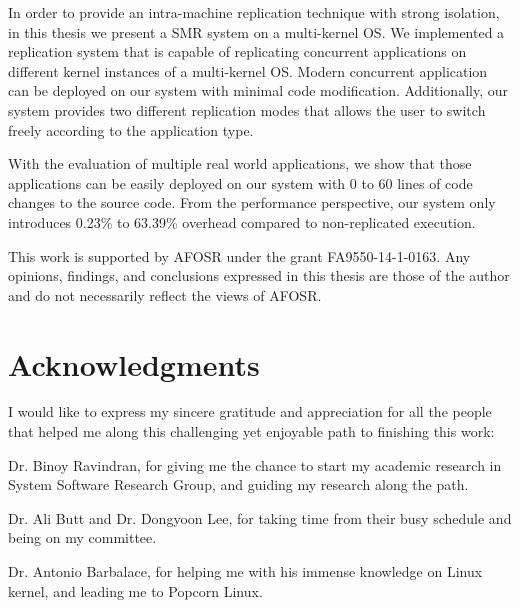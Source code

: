 \documentclass[12pt]{report}
\begin{document}
In order to provide an intra-machine replication technique with strong isolation, in this thesis we present a SMR system on a multi-kernel OS. We implemented a replication system that is capable of replicating concurrent applications on different kernel instances of a multi-kernel OS. Modern concurrent application can be deployed on our system with minimal code modification. Additionally, our system provides two different replication modes that allows the user to switch freely according to the application type.

With the evaluation of multiple real world applications, we show that those applications can be easily deployed on our system with 0 to 60 lines of code changes to the source code. From the performance perspective, our system only introduces 0.23\% to 63.39\% overhead compared to non-replicated execution. 

\vfill


This work is supported by AFOSR under the grant FA9550-14-1-0163.  Any opinions, findings, and conclusions expressed in this thesis are those of the author and do not necessarily reflect the views of AFOSR.

\pagebreak

\chapter*{Acknowledgments}
I would like to express my sincere gratitude and appreciation for all the people that helped me along this challenging yet enjoyable path to finishing this work:

Dr. Binoy Ravindran, for giving me the chance to start my academic research in System Software Research Group, and guiding my research along the path.

Dr. Ali Butt and Dr. Dongyoon Lee, for taking time from their busy schedule and being on my committee.

Dr. Antonio Barbalace, for helping me with his immense knowledge on Linux kernel, and leading me to Popcorn Linux.
\end{document}
